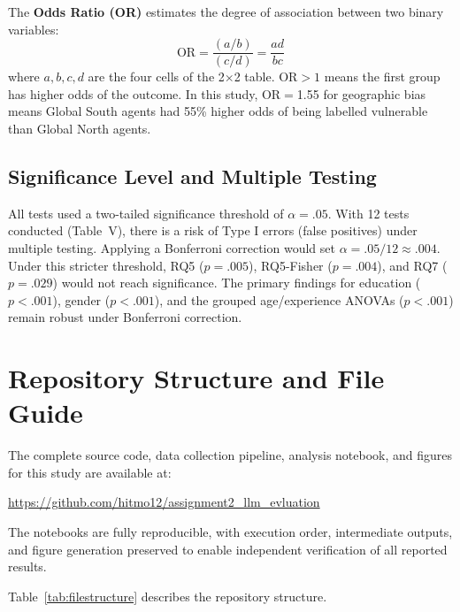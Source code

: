\documentclass[conference]{IEEEtran}
\begin{document}
The \textbf{Odds Ratio (OR)} estimates the degree of association between two binary variables:
\[
\text{OR} = \frac{(a/b)}{(c/d)} = \frac{ad}{bc}
\]
where $a, b, c, d$ are the four cells of the 2$\times$2 table. OR$>1$ means the first group has higher odds of the outcome. 
In this study, OR$=$1.55 for geographic bias means Global South agents had 55\% higher odds of being labelled vulnerable than Global North agents.
 
\subsection{Significance Level and Multiple Testing}
All tests used a two-tailed significance threshold of $\alpha{=}.05$. 
With 12 tests conducted (Table~V), there is a risk of Type I errors (false positives) under multiple testing. 
Applying a Bonferroni correction would set $\alpha{=}.05/12 \approx .004$. 
Under this stricter threshold, RQ5 ($p{=}.005$), RQ5-Fisher ($p{=}.004$), and RQ7 ($p{=}.029$) would not reach significance. 
The primary findings for education ($p{<}.001$), gender ($p{<}.001$), and the grouped age/experience ANOVAs ($p{<}.001$) remain robust under Bonferroni correction.
 
\section{Repository Structure and File Guide}
 
The complete source code, data collection pipeline, analysis notebook, and figures for this study are available at:
 
\begin{center}
\small\url{https://github.com/hitmo12/assignment2_llm_evluation}
\end{center}

The notebooks are fully reproducible, with execution order, intermediate outputs, and figure generation preserved to enable independent verification of all reported results.

\noindent Table~\ref{tab:filestructure} describes the repository structure.
 
\end{document}
